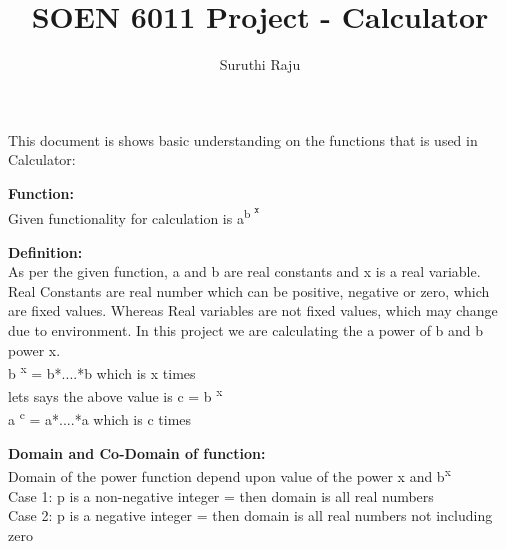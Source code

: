 \documentclass[a4paper,10pt]{article}
\title{SOEN 6011 Project - Calculator}
\author{Suruthi Raju}
\begin{document}
\maketitle

{\fontsize{12}{16}\selectfont This document is shows basic understanding on the functions that is used in Calculator: \\} 

{\Large\textbf{Function:}\\}
\newline
\indent\indent
{\fontsize{12}{16}\selectfont Given functionality for calculation is  a\textsuperscript{b \textsuperscript{x}}\\}

{\Large\textbf{Definition:}\\}
\newline
\indent\indent
{\fontsize{12}{16}\selectfont As per the given function, a and b are real constants and x is a real variable. Real Constants are real number which can be positive, negative or zero, which are fixed values. Whereas Real variables are not fixed values, which may change due to environment. In this project we are calculating the a power of b and b power x. \\}
\newline
\indent\indent
{\fontsize{12}{16}\selectfont b \textsuperscript{x} = b*....*b which is x times \\}
\newline
\indent\indent
{\fontsize{12}{16}\selectfont lets says the above value is c = b \textsuperscript{x} \\}
\newline
\indent\indent
{\fontsize{12}{16}\selectfont a \textsuperscript{c} = a*....*a which is c times \\}

{\Large\textbf{Domain and Co-Domain of function:} \\}
\newline
\indent\indent
{\fontsize{12}{16}\selectfont Domain of the power function depend upon value of the power x and b\textsuperscript{x} \\}
\newline
\indent\indent
{\fontsize{12}{16}\selectfont Case 1: p is a non-negative integer = then domain is all real numbers  \\ }
\newline
\indent\indent
{\fontsize{12}{16}\selectfont Case 2: p is a negative integer = then  domain is all real numbers not including zero  \\}
\end{document}
